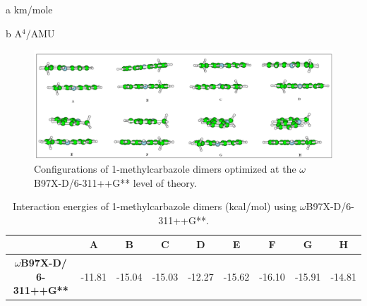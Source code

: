 \begin{table}[H]
\begin{center}
\begin{threeparttable}
\begin{tabular}{c c c c c c c c}
  			\bottomrule
  			\end{tabular}
  			
  			\begin{tablenotes}
  				\item[a] km/mole
  				\item[b] A$^{4}$/AMU
  			\end{tablenotes}
  		\end{threeparttable}
  	\end{center}
  	\label{freq-45-iminoDi}
  \end{table}



\begin{figure}[H]
	\centering
	\includegraphics[scale=0.42]{image/1-methylcarbazole}
	\caption{Configurations of 1-methylcarbazole dimers optimized at the $\omega$B97X-D/6-311++G** level of theory.}
\end{figure}



\begin{table}[H]
	\caption{Interaction energies of 1-methylcarbazole dimers (kcal/mol) using $\omega$B97X-D/6-311++G**.}
	\begin{center}
		\begin{tabular}{c c c c c c c c c}
			\hline
			& A & B & C & D & E & F & G & H \\ \hline
			\textbf{$\omega$B97X-D/
				6-311++G**} & -11.81 & -15.04 & -15.03 & -12.27 & -15.62 & -16.10 & -15.91 & -14.81 \\ \hline
		\end{tabular}
	\end{center}
	\label{}
\end{table}

